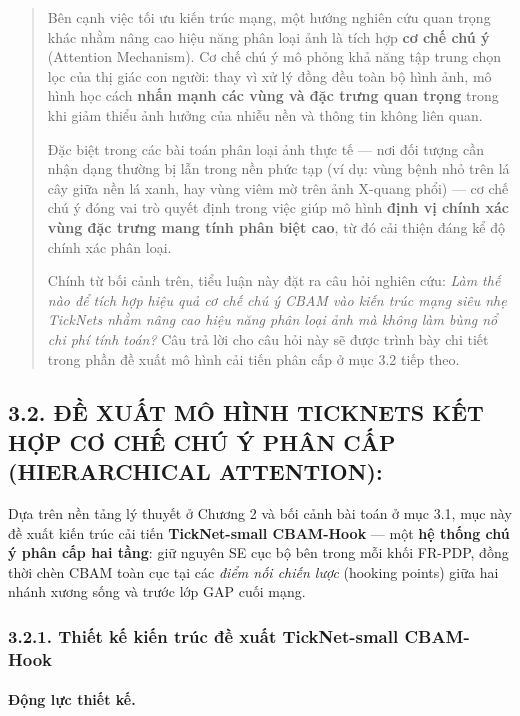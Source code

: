 \documentclass[
]{article}
\begin{document}
\begin{quote}
Bên cạnh việc tối ưu kiến trúc mạng, một hướng nghiên cứu quan trọng khác nhằm nâng cao hiệu năng phân loại ảnh là tích hợp \textbf{cơ chế chú ý} (Attention Mechanism). Cơ chế chú ý mô phỏng khả năng tập trung chọn lọc của thị giác con người: thay vì xử lý đồng đều toàn bộ hình ảnh, mô hình học cách \textbf{nhấn mạnh các vùng và đặc trưng quan trọng} trong khi giảm thiểu ảnh hưởng của nhiễu nền và thông tin không liên quan.

Đặc biệt trong các bài toán phân loại ảnh thực tế --- nơi đối tượng cần nhận dạng thường bị lẫn trong nền phức tạp (ví dụ: vùng bệnh nhỏ trên lá cây giữa nền lá xanh, hay vùng viêm mờ trên ảnh X-quang phổi) --- cơ chế chú ý đóng vai trò quyết định trong việc giúp mô hình \textbf{định vị chính xác vùng đặc trưng mang tính phân biệt cao}, từ đó cải thiện đáng kể độ chính xác phân loại.

Chính từ bối cảnh trên, tiểu luận này đặt ra câu hỏi nghiên cứu: \textit{Làm thế nào để tích hợp hiệu quả cơ chế chú ý CBAM vào kiến trúc mạng siêu nhẹ TickNets nhằm nâng cao hiệu năng phân loại ảnh mà không làm bùng nổ chi phí tính toán?} Câu trả lời cho câu hỏi này sẽ được trình bày chi tiết trong phần đề xuất mô hình cải tiến phân cấp ở mục 3.2 tiếp theo.
\end{quote}

\subsection{3.2. ĐỀ XUẤT MÔ HÌNH TICKNETS KẾT HỢP CƠ CHẾ CHÚ Ý PHÂN CẤP (HIERARCHICAL ATTENTION):}\label{3-2-proposed-model}

Dựa trên nền tảng lý thuyết ở Chương 2 và bối cảnh bài toán ở mục 3.1, mục này đề xuất kiến trúc cải tiến \textbf{TickNet-small CBAM-Hook} --- một \textbf{hệ thống chú ý phân cấp hai tầng}: giữ nguyên SE cục bộ bên trong mỗi khối FR-PDP, đồng thời chèn CBAM toàn cục tại các \textit{điểm nối chiến lược} (hooking points) giữa hai nhánh xương sống và trước lớp GAP cuối mạng.

\subsubsection{3.2.1. Thiết kế kiến trúc đề xuất TickNet-small CBAM-Hook}\label{3-2-1-arch-design}

\paragraph{Động lực thiết kế.}
\end{document}
